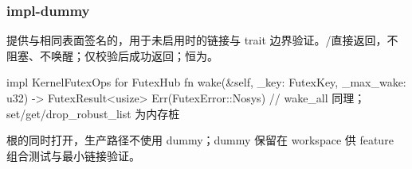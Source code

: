 
\subsubsection{impl-dummy}

提供与相同表面签名的，用于未启用时的链接与 trait 边界验证。/直接返回，不阻塞、不唤醒；仅校验后成功返回；恒为。

\begin{rustcode}
impl KernelFutexOps for FutexHub {
    fn wake(&self, _key: FutexKey, _max_wake: u32) -> FutexResult<usize> {
        Err(FutexError::Nosys)
    }
    // wake_all 同理；set/get/drop_robust_list 为内存桩
}
\end{rustcode}

根的同时打开，生产路径不使用 dummy；dummy 保留在 workspace 供 feature 组合测试与最小链接验证。
